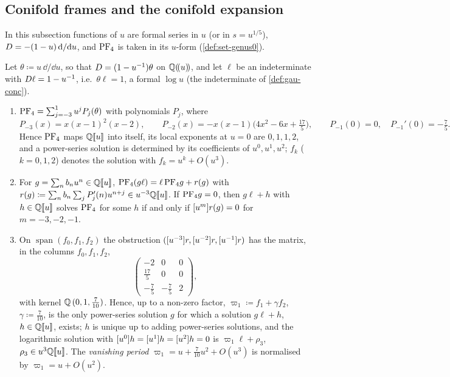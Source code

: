 \subsection{Conifold frames and the conifold expansion}
\label{sec:set-frames}

In this subsection functions of $u$ are formal series in $u$ (or in $s=u^{1/5}$), $D=-(1-u)\,\mathrm{d}/\mathrm{d} u$, and $\mathrm{PF}_{4}$ is taken in its $u$-form (\cref{def:set-genus0}).

\begin{lem}
\label{lem:set-frobbasis}
Let $\theta\coloneqq u\,\dd/\dd u$, so that $D=(1-u^{-1})\theta$ on $\mathbb{Q}(\!(u)\!)$, and let $\ell$ be an indeterminate with $D\ell=1-u^{-1}$, i.e.\ $\theta\ell=1$, a formal $\log u$ (the indeterminate of \cref{def:gau-conc}).
\begin{enumerate}
\item $\mathrm{PF}_{4}=\sum_{j=-3}^{1}u^jP_j(\theta)$ with polynomials $P_j$, where
\[
P_{-3}(x)=x(x-1)^2(x-2),\qquad P_{-2}(x)=-x(x-1)\bigl(4x^2-6x+\tfrac{17}5\bigr),\qquad P_{-1}(0)=0,\quad P_{-1}'(0)=-\tfrac75 .
\]
Hence $\mathrm{PF}_{4}$ maps $\mathbb{Q}[\![ u ]\!]$ into itself, its local exponents at $u=0$ are $0,1,1,2$, and a power-series solution is determined by its coefficients of $u^0,u^1,u^2$; $f_k$ ($k=0,1,2$) denotes the solution with $f_k=u^k+O(u^3)$.
\item For $g=\sum_nb_nu^n\in\mathbb{Q}[\![ u ]\!]$, $\mathrm{PF}_{4}(g\ell)=\ell\,\mathrm{PF}_{4} g+r(g)$ with $r(g)\coloneqq\sum_nb_n\sum_jP_j'(n)u^{n+j}\in u^{-3}\mathbb{Q}[\![ u ]\!]$. If $\mathrm{PF}_{4} g=0$, then $g\ell+h$ with $h\in\mathbb{Q}[\![ u ]\!]$ solves $\mathrm{PF}_{4}$ for some $h$ if and only if $[u^m]r(g)=0$ for $m=-3,-2,-1$.
\item On $\operatorname{span}(f_0,f_1,f_2)$ the obstruction $([u^{-3}]r,[u^{-2}]r,[u^{-1}]r)$ has the matrix, in the columns $f_0,f_1,f_2$,
\[
\begin{pmatrix}-2&0&0\\ \frac{17}5&0&0\\ -\frac75&-\frac75&2\end{pmatrix},
\]
with kernel $\mathbb{Q}\,(0,1,\frac7{10})$. Hence, up to a non-zero factor, $\varpi_1\coloneqq f_1+\gamma f_2$, $\gamma\coloneqq\frac7{10}$, is the only power-series solution $g$ for which a solution $g\ell+h$, $h\in\mathbb{Q}[\![ u ]\!]$, exists; $h$ is unique up to adding power-series solutions, and the logarithmic solution with $[u^0]h=[u^1]h=[u^2]h=0$ is $\varpi_1\ell+\rho_3$, $\rho_3\in u^3\mathbb{Q}[\![ u ]\!]$. The \emph{vanishing period} $\varpi_1=u+\frac7{10}u^2+O(u^3)$ is normalised by $\varpi_1=u+O(u^2)$.
\end{enumerate}
\end{lem}

